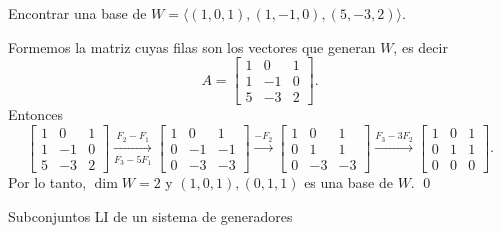 \documentclass[handout]{beamer} %
\newcommand{\la}{\langle}
\newcommand{\ra}{\rangle}
\newcommand{\K}{\mathbb K}
\begin{document}
\begin{frame}
    \begin{ejemplo*}\label{ej-4.5}
        Encontrar una base  de $W= \langle (1,0,1), (1,-1,0), (5,-3,2)\rangle$. 
    \end{ejemplo*}\pause
    \begin{solucion}\pause
        Formemos la matriz cuyas filas son los vectores que generan $W$,  es decir 
        $$
        A = \begin{bmatrix} 1&0&1 \\ 1&-1&0 \\ 5&-3&2 \end{bmatrix}.
        $$
        Entonces
        \begin{equation*}
        \begin{bmatrix}1&0&1 \\ 1&-1&0 \\ 5&-3&2  \end{bmatrix}
        \underset{F_3-5F_1}{\stackrel{F_2- F_1}{\longrightarrow}} 
        \begin{bmatrix}1&0&1 \\ 0&-1&-1 \\ 0&-3&-3\end{bmatrix}
        \stackrel{-F_2}{\longrightarrow} 
        \begin{bmatrix}1&0&1 \\ 0&1&1 \\ 0&-3&-3\end{bmatrix}
        \stackrel{F_3 - 3F_2}{\longrightarrow}
        \begin{bmatrix}1&0&1 \\ 0&1&1 \\ 0&0&0\end{bmatrix}.
        \end{equation*}
        Por lo tanto, $\dim W =2$ y $(1,0,1), (0,1,1)$ es una base de  $W$. \qed
    \end{solucion}
\end{frame}


\begin{frame}{Subconjuntos LI de un sistema de generadores}
    \pause
    \vskip 2cm
\end{frame}
\end{document}

